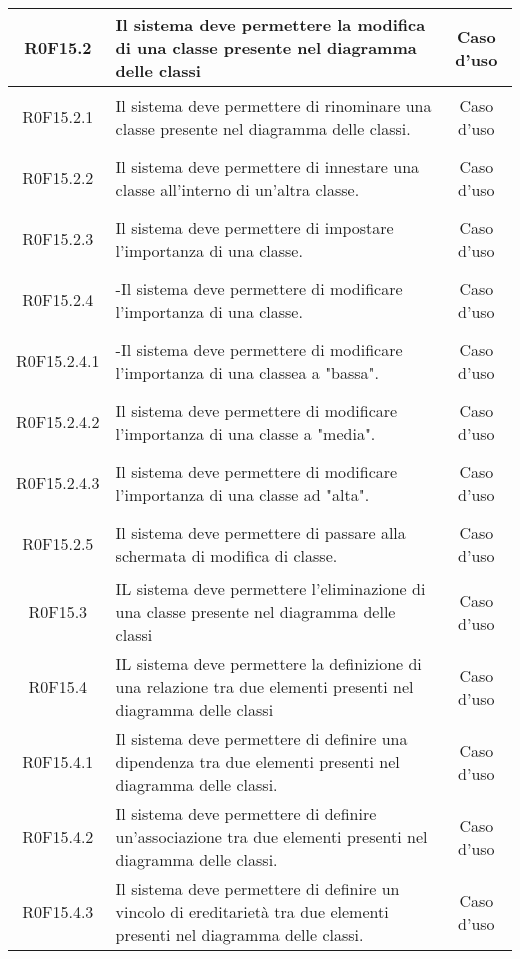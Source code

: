 \documentclass[../AnalisiDeiRequisiti.tex]{subfiles}
\begin{document}
\begin{longtable}{|c|>{\centering}p{7cm}|c|}
	\hypertarget{R0F15.2}{R0F15.2} & Il sistema deve permettere la modifica di una classe presente nel diagramma delle classi & Caso d'uso \\ \hline
	\hypertarget{R0F15.2.1}{R0F15.2.1} & Il sistema deve permettere di rinominare una classe presente nel diagramma delle classi. & Caso d'uso \\ \hline
	\hypertarget{R0F15.2.2}{R0F15.2.2} & Il sistema deve permettere di innestare una classe all'interno di un'altra classe. & Caso d'uso \\ \hline
	\hypertarget{R0F15.2.3}{R0F15.2.3} & Il sistema deve permettere di impostare l'importanza di una classe. & Caso d'uso \\ \hline
	\hypertarget{R0F15.2.4}{R0F15.2.4} & -Il sistema deve permettere di modificare l'importanza di una classe. & Caso d'uso \\ \hline
	\hypertarget{R0F15.2.4.1}{R0F15.2.4.1} & -Il sistema deve permettere di modificare l'importanza di una classea a "bassa". & Caso d'uso \\ \hline
	\hypertarget{R0F15.2.4.2}{R0F15.2.4.2} & Il sistema deve permettere di modificare l'importanza di una classe a "media". & Caso d'uso \\ \hline
	\hypertarget{R0F15.2.4.3}{R0F15.2.4.3} & Il sistema deve permettere di modificare l'importanza di una classe ad "alta". & Caso d'uso \\ \hline
	\hypertarget{R0F15.2.5}{R0F15.2.5} & Il sistema deve permettere di passare alla schermata di modifica di classe. & Caso d'uso \\ \hline
	\hypertarget{R0F15.3}{R0F15.3} & IL sistema deve permettere l'eliminazione di una classe presente nel diagramma delle classi & Caso d'uso \\ \hline
	\hypertarget{R0F15.4}{R0F15.4} & IL sistema deve permettere la definizione di una relazione tra due elementi presenti nel diagramma delle classi & Caso d'uso \\ \hline
	\hypertarget{R0F15.4.1}{R0F15.4.1} & Il sistema deve permettere di definire una dipendenza tra due elementi presenti nel diagramma delle classi. & Caso d'uso \\ \hline
	\hypertarget{R0F15.4.2}{R0F15.4.2} & Il sistema deve permettere di definire un'associazione tra due elementi presenti nel diagramma delle classi. & Caso d'uso \\ \hline
	\hypertarget{R0F15.4.3}{R0F15.4.3} & Il sistema deve permettere di definire un vincolo di ereditarietà tra due elementi presenti nel diagramma delle classi. & Caso d'uso \\ \hline

\end{longtable}
\end{document}
